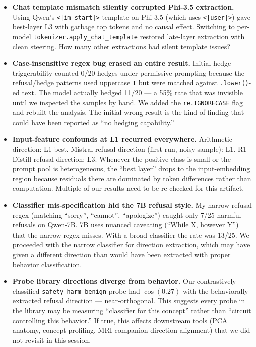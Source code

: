\documentclass[11pt,a4paper]{article}
\begin{document}
\begin{itemize}
\item \textbf{Chat template mismatch silently corrupted Phi-3.5 extraction.} Using Qwen's \texttt{<|im\_start|>} template on Phi-3.5 (which uses \texttt{<|user|>}) gave best-layer L3 with garbage top tokens and no causal effect. Switching to per-model \texttt{tokenizer.apply\_chat\_template} restored late-layer extraction with clean steering. How many other extractions had silent template issues?

\item \textbf{Case-insensitive regex bug erased an entire result.} Initial hedge-triggerability counted 0/20 hedges under permissive prompting because the refusal/hedge patterns used uppercase \texttt{I} but were matched against \texttt{.lower()}-ed text. The model actually hedged 11/20 --- a 55\% rate that was invisible until we inspected the samples by hand. We added the \texttt{re.IGNORECASE} flag and rebuilt the analysis. The initial-wrong result is the kind of finding that could have been reported as ``no hedging capability.''

\item \textbf{Input-feature confounds at L1 recurred everywhere.} Arithmetic direction: L1 best. Mistral refusal direction (first run, noisy sample): L1. R1-Distill refusal direction: L3. Whenever the positive class is small or the prompt pool is heterogeneous, the ``best layer'' drops to the input-embedding region because residuals there are dominated by token differences rather than computation. Multiple of our results need to be re-checked for this artifact.

\item \textbf{Classifier mis-specification hid the 7B refusal style.} My narrow refusal regex (matching ``sorry'', ``cannot'', ``apologize'') caught only 7/25 harmful refusals on Qwen-7B. 7B uses nuanced caveating (``While X, however Y'') that the narrow regex misses. With a broad classifier the rate was 13/25. We proceeded with the narrow classifier for direction extraction, which may have given a different direction than would have been extracted with proper behavior classification.

\item \textbf{Probe library directions diverge from behavior.} Our contrastively-classified \texttt{safety\_harm\_benign} probe had $\cos(0.27)$ with the behaviorally-extracted refusal direction --- near-orthogonal. This suggests every probe in the library may be measuring ``classifier for this concept'' rather than ``circuit controlling this behavior.'' If true, this affects downstream tools (PCA anatomy, concept profiling, MRI companion direction-alignment) that we did not revisit in this session.
\end{itemize}
\end{document}
